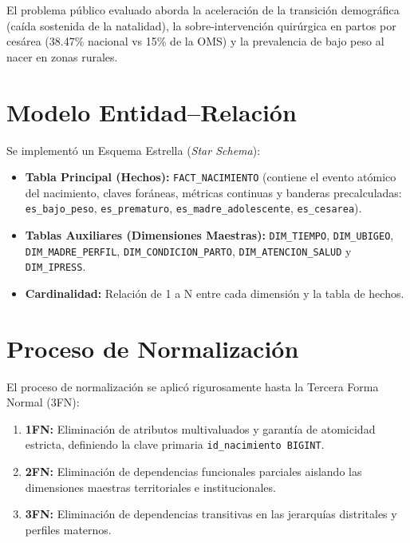 \documentclass[12pt,a4paper]{article}
\begin{document}
El problema público evaluado aborda la aceleración de la transición demográfica (caída sostenida de la natalidad), la sobre-intervención quirúrgica en partos por cesárea (38.47\% nacional vs 15\% de la OMS) y la prevalencia de bajo peso al nacer en zonas rurales.

\section{Modelo Entidad–Relación}

Se implementó un Esquema Estrella (\textit{Star Schema}):
\begin{itemize}
    \item \textbf{Tabla Principal (Hechos):} \texttt{FACT\_NACIMIENTO} (contiene el evento atómico del nacimiento, claves foráneas, métricas continuas y banderas precalculadas: \texttt{es\_bajo\_peso}, \texttt{es\_prematuro}, \texttt{es\_madre\_adolescente}, \texttt{es\_cesarea}).
    \item \textbf{Tablas Auxiliares (Dimensiones Maestras):} \texttt{DIM\_TIEMPO}, \texttt{DIM\_UBIGEO}, \texttt{DIM\_MADRE\_PERFIL}, \texttt{DIM\_CONDICION\_PARTO}, \texttt{DIM\_ATENCION\_SALUD} y \texttt{DIM\_IPRESS}.
    \item \textbf{Cardinalidad:} Relación de 1 a N entre cada dimensión y la tabla de hechos.
\end{itemize}

\section{Proceso de Normalización}

El proceso de normalización se aplicó rigurosamente hasta la Tercera Forma Normal (3FN):
\begin{enumerate}
    \item \textbf{1FN:} Eliminación de atributos multivaluados y garantía de atomicidad estricta, definiendo la clave primaria \texttt{id\_nacimiento BIGINT}.
    \item \textbf{2FN:} Eliminación de dependencias funcionales parciales aislando las dimensiones maestras territoriales e institucionales.
    \item \textbf{3FN:} Eliminación de dependencias transitivas en las jerarquías distritales y perfiles maternos.
\end{enumerate}
\end{document}
